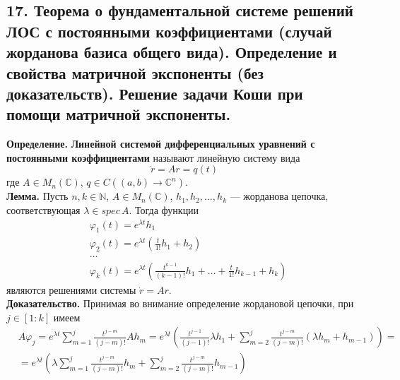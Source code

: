 \subsection*{17. Теорема о фундаментальной системе решений ЛОС с постоянными коэффициентами (случай жорданова базиса общего вида). Определение и свойства матричной экспоненты (без доказательств). Решение задачи Коши при помощи матричной экспоненты.}

\textbf{Определение.} \textbf{Линейной системой дифференциальных уравнений с постоянными коэффициентами} называют линейную систему вида
\begin{equation}
    \dot{r} = Ar = q(t) \label{linpost}
\end{equation}
где $A \in M_n(\mathbb{C})$, $q \in C((a,b) \to \mathbb{C}^n)$.\\

\noindent \textbf{Лемма.} Пусть $n, k \in \mathbb{N}$, $A \in M_n(\mathbb{C})$, $h_1, h_2, \ldots, h_k$ --- жорданова цепочка, соответствующая $\lambda \in spec\, A$. Тогда функции
\begin{equation*}
    \begin{aligned}
         & \varphi_1(t) = e^{\lambda t}h_1                                                                         \\
         & \varphi_2(t) = e^{\lambda t}\left(\frac{t}{1!}h_1 + h_2\right)                                          \\
         & \ldots                                                                                                  \\
         & \varphi_k(t) = e^{\lambda t}\left(\frac{t^{k-1}}{(k-1)!}h_1 + \ldots + \frac{t}{1!}h_{k-1} + h_k\right)
    \end{aligned}
\end{equation*}
являются решениями системы $\dot{r} = Ar$.\\

\noindent \textbf{Доказательство.} Принимая во внимание определение жордановой цепочки, при $j \in [1 : k]$ имеем
\begin{equation*}
    \begin{aligned}
         & A\varphi_j = e^{\lambda t}\sum_{m=1}^j \frac{t^{j-m}}{(j-m)!}Ah_m = e^{\lambda t} \left(\frac{t^{j-1}}{(j-1)!}\lambda h_1 + \sum_{m=2}^j \frac{t^{j-m}}{(j-m)!}(\lambda h_m + h_{m - 1}) \right) = \\
         & = e^{\lambda t}\left(\lambda \sum_{m=1}^j \frac{t^{j - m}}{(j - m)!}h_m + \sum_{m = 2}^j \frac{t^{j-m}}{(j - m)!}h_{m-1} \right)
    \end{aligned}
\end{equation*}

